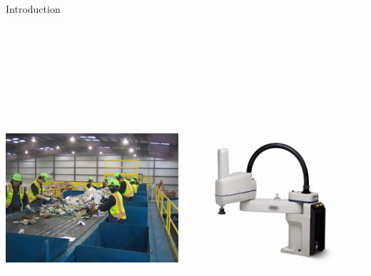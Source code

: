 \documentclass[final]{beamer}
\begin{document}
\begin{frame}{}
{\begin{columns}[t]
\begin{column}{.30\linewidth}
\begin{block}{\centering Introduction}
\begin{columns}[T]
\begin{column}{16cm}{}
	\vspace{0.5cm}
	\centering \includegraphics[height=12cm, width = 14cm]{figures/mrf-recycling-system.jpg}\\
\end{column}
\begin{column}{16cm}{}
	\centering \includegraphics[height=12cm, width = 14cm]{figures/scara.jpg}\\
\end{column}


\end{columns}
\end{block}
\end{column}
\end{columns}}
\end{frame}
\end{document}
